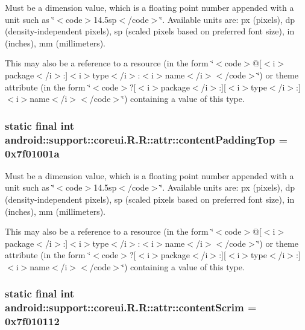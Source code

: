 Must be a dimension value, which is a floating point number appended with a unit such as \char`\"{}$<$code$>$14.5sp$<$/code$>$\char`\"{}. Available units are: px (pixels), dp (density-independent pixels), sp (scaled pixels based on preferred font size), in (inches), mm (millimeters). 

This may also be a reference to a resource (in the form \char`\"{}$<$code$>$@\mbox{[}$<$i$>$package$<$/i$>$:\mbox{]}$<$i$>$type$<$/i$>$:$<$i$>$name$<$/i$>$$<$/code$>$\char`\"{}) or theme attribute (in the form \char`\"{}$<$code$>$?\mbox{[}$<$i$>$package$<$/i$>$:\mbox{]}\mbox{[}$<$i$>$type$<$/i$>$:\mbox{]}$<$i$>$name$<$/i$>$$<$/code$>$\char`\"{}) containing a value of this type. \hypertarget{classandroid_1_1support_1_1coreui_1_1_r_1_1attr_fbb22f3fb0cafbe75daac70165f03114}{
\subsubsection[{contentPaddingTop}]{\setlength{\rightskip}{0pt plus 5cm}static final int android::support::coreui.R.R::attr::contentPaddingTop = 0x7f01001a}}
\label{classandroid_1_1support_1_1coreui_1_1_r_1_1attr_fbb22f3fb0cafbe75daac70165f03114}


Must be a dimension value, which is a floating point number appended with a unit such as \char`\"{}$<$code$>$14.5sp$<$/code$>$\char`\"{}. Available units are: px (pixels), dp (density-independent pixels), sp (scaled pixels based on preferred font size), in (inches), mm (millimeters). 

This may also be a reference to a resource (in the form \char`\"{}$<$code$>$@\mbox{[}$<$i$>$package$<$/i$>$:\mbox{]}$<$i$>$type$<$/i$>$:$<$i$>$name$<$/i$>$$<$/code$>$\char`\"{}) or theme attribute (in the form \char`\"{}$<$code$>$?\mbox{[}$<$i$>$package$<$/i$>$:\mbox{]}\mbox{[}$<$i$>$type$<$/i$>$:\mbox{]}$<$i$>$name$<$/i$>$$<$/code$>$\char`\"{}) containing a value of this type. \hypertarget{classandroid_1_1support_1_1coreui_1_1_r_1_1attr_e852546088e2f9daf5ac4ca4f4129848}{
\subsubsection[{contentScrim}]{\setlength{\rightskip}{0pt plus 5cm}static final int android::support::coreui.R.R::attr::contentScrim = 0x7f010112}}
\label{classandroid_1_1support_1_1coreui_1_1_r_1_1attr_e852546088e2f9daf5ac4ca4f4129848}


